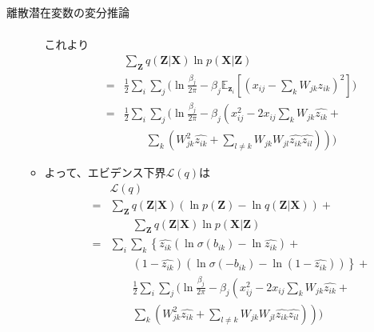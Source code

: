 \documentclass[dvipdfmx,notheorems,t]{beamer}
\begin{document}
\begin{frame}{離散潜在変数の変分推論}
\begin{itemize}
\begin{itemize}
\begin{eqnarray}
		\end{eqnarray}
		これより
		\begin{eqnarray}
			&& \sum_{\bm{Z}} q(\bm{Z} | \bm{X}) \ln p(\bm{X} | \bm{Z}) \nonumber \\
			&=& \frac{1}{2} \sum_i \sum_j \Bigg( \ln \frac{\beta_j}{2\pi} - \beta_j \mathbb{E}_{\bm{z}_i} \left[ \left( x_{ij} - \sum_k W_{jk} z_{ik} \right)^2 \right] \Bigg) \\
			&=& \frac{1}{2} \sum_i \sum_j \Bigg( \ln \frac{\beta_j}{2\pi} - \beta_j \left( x_{ij}^2 - 2 x_{ij} \sum_k W_{jk} \widehat{z_{ik}} + \right. \nonumber \\
			&& \qquad \left. \sum_k \left( W_{jk}^2 \widehat{z_{ik}} + \sum_{l \neq k} W_{jk} W_{jl} \widehat{z_{ik}} \widehat{z_{il}} \right) \right) \Bigg)
		\end{eqnarray}
		
		\item よって、エビデンス下界$\mathcal{L}(q)$は
		\begin{eqnarray}
			&& \mathcal{L}(q) \nonumber \\
			&=& \sum_{\bm{Z}} q(\bm{Z} | \bm{X}) \left( \ln p(\bm{Z}) - \ln q(\bm{Z} | \bm{X}) \right) + \nonumber \\
			&& \qquad \sum_{\bm{Z}} q(\bm{Z} | \bm{X}) \ln p(\bm{X} | \bm{Z}) \\
			&=& \sum_i \sum_k \left\{ \widehat{z_{ik}} \left( \ln \sigma(b_{ik}) - \ln \widehat{z_{ik}} \right) + \right. \nonumber \\
			&& \qquad \left. \left( 1 - \widehat{z_{ik}} \right) \left( \ln \sigma(-b_{ik}) - \ln \left( 1 - \widehat{z_{ik}} \right) \right) \right\} + \nonumber \\
			&& \qquad \frac{1}{2} \sum_i \sum_j \Bigg( \ln \frac{\beta_j}{2\pi} - \beta_j \left( x_{ij}^2 - 2 x_{ij} \sum_k W_{jk} \widehat{z_{ik}} + \right. \nonumber \\
			&& \qquad \left. \sum_k \left( W_{jk}^2 \widehat{z_{ik}} + \sum_{l \neq k} W_{jk} W_{jl} \widehat{z_{ik}} \widehat{z_{il}} \right) \right) \Bigg)
		\end{eqnarray}
		

\end{itemize}
\end{itemize}
\end{frame}
\end{document}
